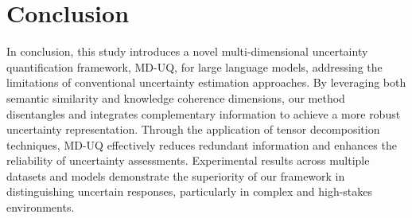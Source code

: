 \section{Conclusion}
In conclusion, this study introduces a novel multi-dimensional uncertainty quantification framework, MD-UQ, for large language models, addressing the limitations of conventional uncertainty estimation approaches. By leveraging both semantic similarity and knowledge coherence dimensions, our method disentangles and integrates complementary information to achieve a more robust uncertainty representation. Through the application of tensor decomposition techniques, MD-UQ effectively reduces redundant information and enhances the reliability of uncertainty assessments. Experimental results across multiple datasets and models demonstrate the superiority of our framework in distinguishing uncertain responses, particularly in complex and high-stakes environments. 